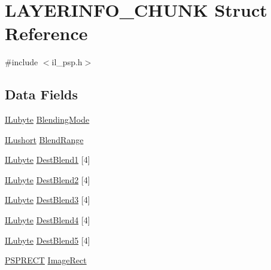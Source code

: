 \hypertarget{struct_l_a_y_e_r_i_n_f_o___c_h_u_n_k}{\section{L\-A\-Y\-E\-R\-I\-N\-F\-O\-\_\-\-C\-H\-U\-N\-K Struct Reference}
\label{struct_l_a_y_e_r_i_n_f_o___c_h_u_n_k}
}


{\ttfamily \#include $<$il\-\_\-psp.\-h$>$}

\subsection*{Data Fields}
\begin{DoxyCompactItemize}
\item 
\hyperlink{il_8h_a8d2f04500100a86d1b00e98ab1b15a33}{I\-Lubyte} \hyperlink{struct_l_a_y_e_r_i_n_f_o___c_h_u_n_k_a07b73964d473bf0a6cbde2862b583a29}{Blending\-Mode}
\item 
\hyperlink{il_8h_af6287b43748354a7c4864da43ae56962}{I\-Lushort} \hyperlink{struct_l_a_y_e_r_i_n_f_o___c_h_u_n_k_af6d0d096851dccfab0eb8a6d9ec41aa2}{Blend\-Range}
\item 
\hyperlink{il_8h_a8d2f04500100a86d1b00e98ab1b15a33}{I\-Lubyte} \hyperlink{struct_l_a_y_e_r_i_n_f_o___c_h_u_n_k_a97b2e8c5dda6331b75a2903c1ba432ce}{Dest\-Blend1} \mbox{[}4\mbox{]}
\item 
\hyperlink{il_8h_a8d2f04500100a86d1b00e98ab1b15a33}{I\-Lubyte} \hyperlink{struct_l_a_y_e_r_i_n_f_o___c_h_u_n_k_a4b35368578adfa2817bc722a9d9afd59}{Dest\-Blend2} \mbox{[}4\mbox{]}
\item 
\hyperlink{il_8h_a8d2f04500100a86d1b00e98ab1b15a33}{I\-Lubyte} \hyperlink{struct_l_a_y_e_r_i_n_f_o___c_h_u_n_k_a5410a9151d48c4d4370d3d6d8e5eabf6}{Dest\-Blend3} \mbox{[}4\mbox{]}
\item 
\hyperlink{il_8h_a8d2f04500100a86d1b00e98ab1b15a33}{I\-Lubyte} \hyperlink{struct_l_a_y_e_r_i_n_f_o___c_h_u_n_k_a476f4436c15081ecbe6931f48540d27d}{Dest\-Blend4} \mbox{[}4\mbox{]}
\item 
\hyperlink{il_8h_a8d2f04500100a86d1b00e98ab1b15a33}{I\-Lubyte} \hyperlink{struct_l_a_y_e_r_i_n_f_o___c_h_u_n_k_acfffe8de4dc0ffe1928def745c857b21}{Dest\-Blend5} \mbox{[}4\mbox{]}
\item 
\hyperlink{struct_p_s_p_r_e_c_t}{P\-S\-P\-R\-E\-C\-T} \hyperlink{struct_l_a_y_e_r_i_n_f_o___c_h_u_n_k_a70807cdf201196db59b92bb788e0e176}{Image\-Rect}
\item 

\end{DoxyCompactItemize}
